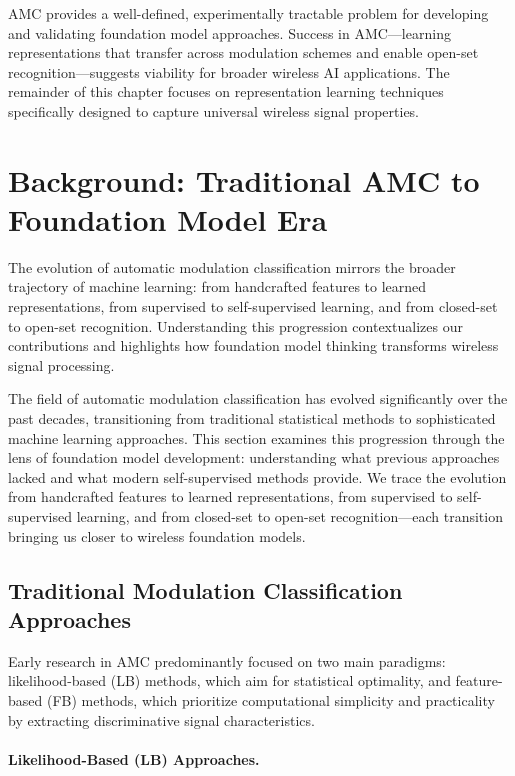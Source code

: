 AMC provides a well-defined, experimentally tractable problem for developing and validating foundation model approaches. Success in AMC—learning representations that transfer across modulation schemes and enable open-set recognition—suggests viability for broader wireless AI applications. The remainder of this chapter focuses on representation learning techniques specifically designed to capture universal wireless signal properties.

\section{Background: Traditional AMC to Foundation Model Era}

The evolution of automatic modulation classification mirrors the broader trajectory of machine learning: from handcrafted features to learned representations, from supervised to self-supervised learning, and from closed-set to open-set recognition. Understanding this progression contextualizes our contributions and highlights how foundation model thinking transforms wireless signal processing.

The field of automatic modulation classification has evolved significantly over the past decades, transitioning from traditional statistical methods to sophisticated machine learning approaches. This section examines this progression through the lens of foundation model development: understanding what previous approaches lacked and what modern self-supervised methods provide. We trace the evolution from handcrafted features to learned representations, from supervised to self-supervised learning, and from closed-set to open-set recognition—each transition bringing us closer to wireless foundation models.

\subsection{Traditional Modulation Classification Approaches}\label{sec:traditional}

Early research in AMC predominantly focused on two main paradigms: likelihood-based (LB) methods, which aim for statistical optimality, and feature-based (FB) methods, which prioritize computational simplicity and practicality by extracting discriminative signal characteristics.

\paragraph{Likelihood-Based (LB) Approaches.}

